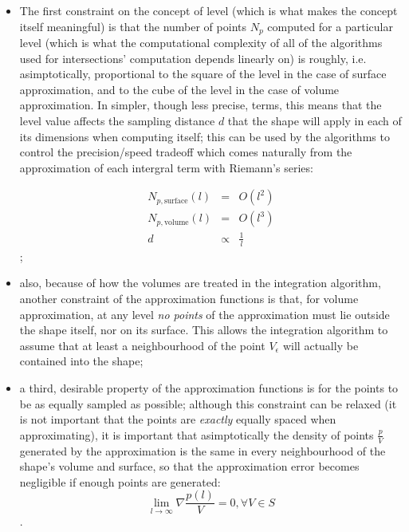 \begin{itemize}
  \item{The first constraint on the  concept of level
      (which is what makes the concept itself meaningful) is that the number of points
      $N_p$
      computed for a particular level (which is what the computational complexity of
      all of the algorithms used for intersections' computation depends linearly on)
      is roughly, i.e. asimptotically, proportional to the square of the level in the
      case of surface approximation, and to the cube of the level in the case of
      volume approximation. In simpler, though less precise, terms, this means that
      the level value affects the sampling distance $d$ that the shape will apply in each
      of its dimensions when computing itself; this can be used by the algorithms to
      control the precision/speed tradeoff which comes naturally from the
      approximation of each intergral term with Riemann's series:

      \begin{eqnarray}
        N_{p,\text{surface}}(l)& = & O(l^2) \\
        N_{p,\text{volume}}(l) & = & O(l^3) \label{volume-l-3}\\
        d & \propto & \frac{1}{l}
      \end{eqnarray}
    ;}
  \item{also, because of how the volumes are treated in the integration
      algorithm, another constraint of the approximation functions is that, for
      volume approximation, at any level \emph{no points} of the approximation
      must lie outside the shape itself, nor on its surface. This allows the
      integration algorithm to assume that at least a neighbourhood of the point
    $V_{\epsilon}$ will actually be contained into the shape;}
  \item{a third, desirable property of the approximation functions is for the
      points to be as equally sampled as possible; although this constraint can be
      relaxed (it is not important that the points are \emph{exactly} equally
      spaced when approximating), it is important
      that asimptotically the density of points $\frac{p}{V}$ generated by the approximation
      is the same in every neighbourhood of the shape's volume and surface, so
      that the approximation error becomes negligible if enough points are
      generated:
      \begin{equation} \label{eqn:points_with_constant_density}
        \lim_{l \rightarrow \infty} \nabla \frac{p(l)}{V} = 0, \forall V
        \in S
    \end{equation}.
  }
\end{itemize}

